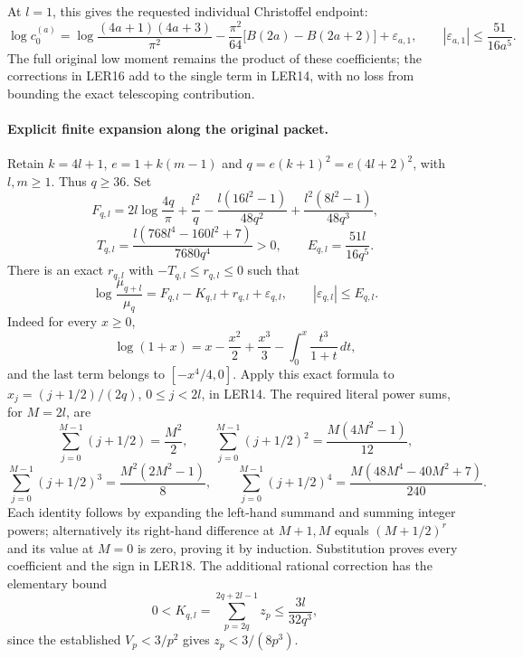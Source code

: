 At $l=1$, this gives the requested individual Christoffel endpoint:
\[
 \boxed{\displaystyle
 \log c_0^{(a)}
 =\log\frac{(4a+1)(4a+3)}{\pi^2}
 -\frac{\pi^2}{64}\bigl[B(2a)-B(2a+2)\bigr]
 +\varepsilon_{a,1},\qquad
 |\varepsilon_{a,1}|\le\frac{51}{16a^5}.}
 \tag{LER16}
\]
The full original low moment remains the product of these coefficients;
the corrections in LER16 add to the single term in LER14, with no
loss from bounding the exact telescoping contribution.

\paragraph{Explicit finite expansion along the original packet.}
Retain $k=4l+1$, $e=1+k(m-1)$ and
$q=e(k+1)^2=e(4l+2)^2$, with $l,m\ge1$. Thus $q\ge36$.
Set
\[
 F_{q,l}=2l\log\frac{4q}{\pi}
 +\frac{l^2}{q}-\frac{l(16l^2-1)}{48q^2}
 +\frac{l^2(8l^2-1)}{48q^3},
\]
\[
 T_{q,l}=\frac{l(768l^4-160l^2+7)}{7680q^4}>0,
 \qquad E_{q,l}=\frac{51l}{16q^5}.
 \tag{LER17}
\]
There is an exact $r_{q,l}$ with $-T_{q,l}\le r_{q,l}\le0$ such that
\[
 \boxed{\displaystyle
 \log\frac{\mu_{q+l}}{\mu_q}
 =F_{q,l}-K_{q,l}+r_{q,l}+\varepsilon_{q,l},\qquad
 |\varepsilon_{q,l}|\le E_{q,l}.}
 \tag{LER18}
\]
Indeed for every $x\ge0$,
\[
 \log(1+x)=x-\frac{x^2}{2}+\frac{x^3}{3}
              -\int_0^x\frac{t^3}{1+t}\,dt,
\]
and the last term belongs to $[-x^4/4,0]$.
Apply this exact formula to $x_j=(j+1/2)/(2q)$, $0\le j<2l$,
in LER14. The required literal power sums, for $M=2l$, are
\[
 \sum_{j=0}^{M-1}(j+1/2)=\frac{M^2}{2},\qquad
 \sum_{j=0}^{M-1}(j+1/2)^2=\frac{M(4M^2-1)}{12},
\]
\[
 \sum_{j=0}^{M-1}(j+1/2)^3=\frac{M^2(2M^2-1)}8,\qquad
 \sum_{j=0}^{M-1}(j+1/2)^4
 =\frac{M(48M^4-40M^2+7)}{240}.
 \tag{LER19}
\]
Each identity follows by expanding the left-hand summand and summing
integer powers; alternatively its right-hand difference at $M+1,M$
equals $(M+1/2)^r$ and its value at $M=0$ is zero, proving it by
induction. Substitution proves every coefficient and the sign in LER18.
The additional rational correction has the elementary bound
\[
 0<K_{q,l}=\sum_{p=2q}^{2q+2l-1}z_p
 \le\frac{3l}{32q^3},
 \tag{LER20}
\]
since the established $V_p<3/p^2$ gives $z_p<3/(8p^3)$.


